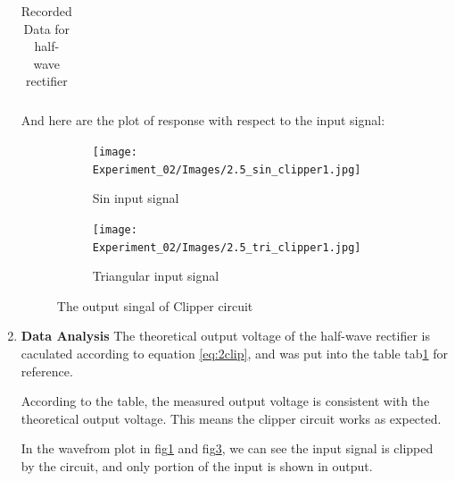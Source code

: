 \begin{enumerate}[I]
\begin{table}[h]
\begin{tabular}{l|cccccccc}
                \end{tabular}
                    \caption{Recorded Data for half-wave rectifier}
                \label{tab:2clip}
            \end{table}
        And here are the plot of response with respect to the input signal:
        \begin{figure}[H]
            \centering
            \begin{subfigure}{0.45\textwidth}
                \texttt{[image: Experiment\_02/Images/2.5\_sin\_clipper1.jpg]}
                \caption{Sin input signal}
                \label{wave:2bSin}
            \end{subfigure}
            \begin{subfigure}{0.45\textwidth}
                \texttt{[image: Experiment\_02/Images/2.5\_tri\_clipper1.jpg]}
                \caption{Triangular input signal}
                \label{wave:2bTri}
            \end{subfigure}
            \caption{The output singal of Clipper circuit}
        \end{figure}
        
        \item \textbf{Data Analysis}\newline
            The theoretical output voltage of the half-wave rectifier is caculated according to equation \ref{eq:2clip}, and was put into the table tab\ref{tab:2clip} for reference.\par

            According to the table, the measured output voltage is consistent with the theoretical output voltage. This means the clipper circuit works as expected.\par

            In the wavefrom plot in fig\ref{wave:2bSin} and fig\ref{wave:2bTri}, we can see the input signal is clipped by the circuit, and only portion of the input is shown in output.\par
    \end{enumerate}

